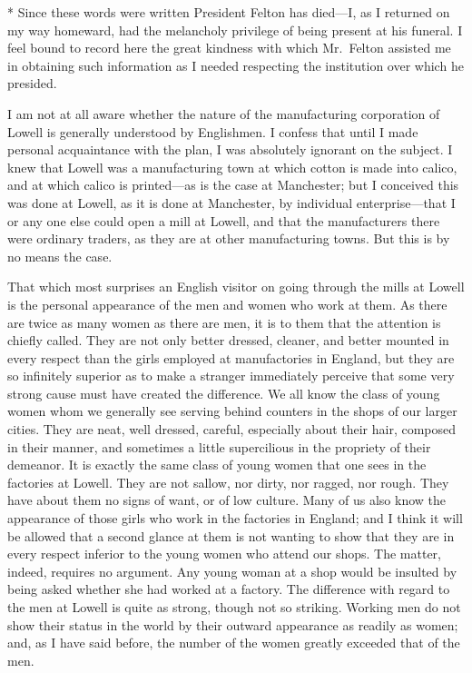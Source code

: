 * Since these words were written President Felton has died---I, as I
returned on my way homeward, had the melancholy privilege of being
present at his funeral.  I feel bound to record here the great
kindness with which Mr.\ Felton assisted me in obtaining such
information as I needed respecting the institution over which he
presided.


I am not at all aware whether the nature of the manufacturing
corporation of Lowell is generally understood by Englishmen.  I
confess that until I made personal acquaintance with the plan, I
was absolutely ignorant on the subject.  I knew that Lowell was a
manufacturing town at which cotton is made into calico, and at
which calico is printed---as is the case at Manchester; but I
conceived this was done at Lowell, as it is done at Manchester, by
individual enterprise---that I or any one else could open a mill at
Lowell, and that the manufacturers there were ordinary traders, as
they are at other manufacturing towns.  But this is by no means the
case.

That which most surprises an English visitor on going through the
mills at Lowell is the personal appearance of the men and women who
work at them.  As there are twice as many women as there are men,
it is to them that the attention is chiefly called.  They are not
only better dressed, cleaner, and better mounted in every respect
than the girls employed at manufactories in England, but they are
so infinitely superior as to make a stranger immediately perceive
that some very strong cause must have created the difference.  We
all know the class of young women whom we generally see serving
behind counters in the shops of our larger cities.  They are neat,
well dressed, careful, especially about their hair, composed in
their manner, and sometimes a little supercilious in the propriety
of their demeanor.  It is exactly the same class of young women
that one sees in the factories at Lowell.  They are not sallow, nor
dirty, nor ragged, nor rough.  They have about them no signs of
want, or of low culture.  Many of us also know the appearance of
those girls who work in the factories in England; and I think it
will be allowed that a second glance at them is not wanting to show
that they are in every respect inferior to the young women who
attend our shops.  The matter, indeed, requires no argument.  Any
young woman at a shop would be insulted by being asked whether she
had worked at a factory.  The difference with regard to the men at
Lowell is quite as strong, though not so striking.  Working men do
not show their status in the world by their outward appearance as
readily as women; and, as I have said before, the number of the
women greatly exceeded that of the men.


